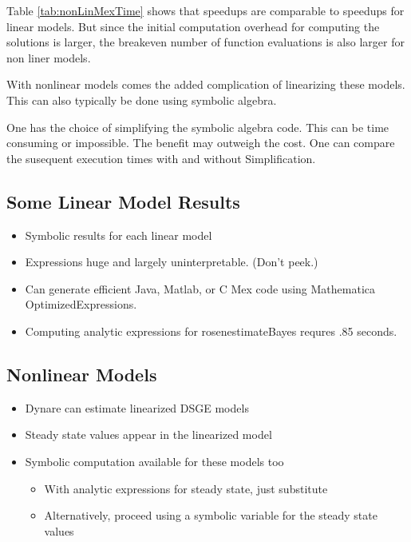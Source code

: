 \documentclass[12pt]{article}
\begin{document}


Table \ref{tab:nonLinMexTime} shows that
speedups are comparable to speedups for linear models. But since the 
initial computation overhead for computing the solutions is larger, the
breakeven number of function evaluations is also larger for non liner models.

    
With nonlinear models comes the added complication of linearizing these models.
This can also typically be done using symbolic algebra.

One has the choice of simplifying the symbolic algebra code. This can be
time consuming or impossible.  The benefit may outweigh the cost.
One can compare the susequent execution times with and without Simplification.












\newcommand{\bLine}[6]{#1&#2&#3&#4&#5&#6\\}
   \subsection{Some Linear Model Results}
    \begin{itemize}
    \item Symbolic results for each linear model \ 
  \item  Expressions huge and largely uninterpretable. (Don't peek.)
  \item Can generate efficient Java, Matlab, or C Mex code using Mathematica OptimizedExpressions\cite{sofroniou04,sofroniou04a}.
  \item Computing analytic expressions for rosenestimateBayes requres .85 seconds.\ 

   

    \end{itemize}






  \subsection{Nonlinear Models}
  \begin{itemize}
  \item Dynare can estimate linearized DSGE models
  \item Steady state values appear in the linearized model
  \item Symbolic computation available for these models too
      \begin{itemize}
      \item With analytic expressions for steady state, just substitute
      \item Alternatively, proceed using  a symbolic variable for the 
        steady state values
      \end{itemize}
  \end{itemize}
\end{document}
